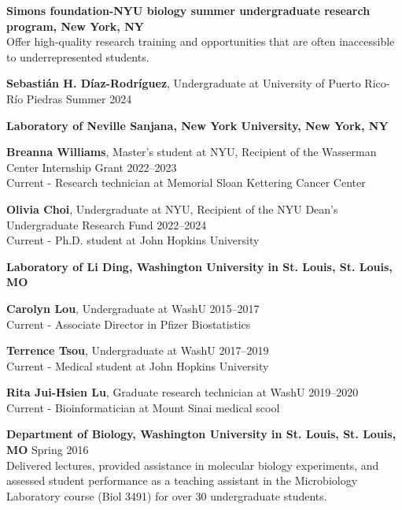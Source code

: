 \documentclass[letterpaper,11pt]{cv}
\begin{document}
\begin{entrylist}
\raggedright
\item \textbf{Simons foundation-NYU biology summer undergraduate research program, New York, NY}\\  
{\small Offer high-quality research training and opportunities that are often inaccessible to underrepresented students.}
\begin{detaillist}
    \item \textbf{Sebastián H. Díaz-Rodríguez}, Undergraduate at University of Puerto Rico-Río Piedras \hfill Summer 2024 \\
\end{detaillist}
\item \textbf{Laboratory of Neville Sanjana, New York University, New York, NY}\\
    \begin{detaillist}
       \item \textbf{Breanna Williams}, Master's student at NYU, Recipient of the Wasserman Center Internship Grant \hfill 2022--2023\\
       Current - Research technician at Memorial Sloan Kettering Cancer Center
       \item \textbf{Olivia Choi}, Undergraduate at NYU, Recipient of the NYU Dean's Undergraduate Research Fund \hfill 2022--2024\\
       Current - Ph.D. student at John Hopkins University
    \end{detaillist}
\item \textbf{Laboratory of Li Ding, Washington University in St. Louis, St. Louis, MO}\\
    \begin{detaillist}
    \item \textbf{Carolyn Lou}, Undergraduate at WashU \hfill 2015--2017\\
    Current - Associate Director in Pfizer Biostatistics
    \item \textbf{Terrence Tsou}, Undergraduate at WashU \hfill 2017--2019\\
    Current - Medical student at John Hopkins University
    \item \textbf{Rita Jui-Hsien Lu}, Graduate research technician at WashU \hfill 2019--2020\\
    Current - Bioinformatician at Mount Sinai medical scool
    \end{detaillist}
\item \textbf{Department of Biology, Washington University in St. Louis, St. Louis, MO} \hfill Spring 2016 \\
    {\small Delivered lectures, provided assistance in molecular biology experiments, and assessed student performance as a teaching assistant in the Microbiology Laboratory course (Biol 3491) for over 30 undergraduate students.}
\end{entrylist}
\end{document}
